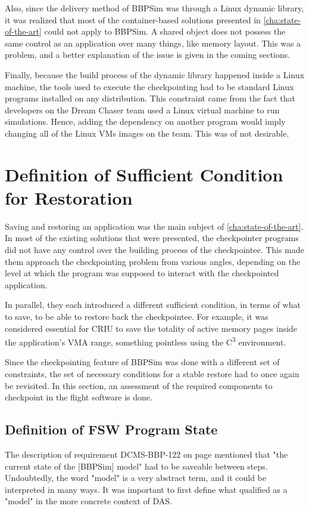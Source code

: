 {Also, since the delivery method of BBPSim was through a Linux dynamic library, it was realized that most of the container-based solutions presented in \autoref{cha:state-of-the-art} could not apply to BBPSim. A shared object does not possess the same control as an application over many things, like memory layout. This was a problem, and a better explanation of the issue is given in the coming sections.

Finally, because the build process of the dynamic library happened inside a Linux machine, the tools used to execute the checkpointing had to be standard Linux programs installed on any distribution. This constraint came from the fact that developers on the Dream Chaser team used a Linux virtual machine to run simulations. Hence, adding the dependency on another program would imply changing all of the Linux VMs images on the team. This was of not desirable.

\section{Definition of Sufficient Condition for Restoration}\label{sec:conditions}
Saving and restoring an application was the main subject of \autoref{cha:state-of-the-art}. In most of the existing solutions that were presented, the checkpointer programs did not have any control over the building process of the checkpointee. This made them approach the checkpointing problem from various angles, depending on the level at which the program was supposed to interact with the checkpointed application. 

In parallel, they each introduced a different sufficient condition, in terms of what to save, to be able to restore back the checkpointee. For example, it was considered essential for CRIU to save the totality of active memory pages inside the application's \gls{VMA} range, something pointless using the C\textsuperscript{3} environment.

Since the checkpointing feature of BBPSim was done with a different set of constraints, the set of necessary conditions for a stable restore had to once again be revisited. In this section, an assessment of the required components to checkpoint in the flight software is done. 

\subsection*{Definition of FSW Program State}
The description of requirement DCMS-BBP-122 on page \pageref{tab:customer-reqs} mentioned that "the current state of the [BBPSim] model" had to be saveable between steps. Undoubtedly, the word "model" is a very abstract term, and it could be interpreted in many ways. It was important to first define what qualified as a "model" in the more concrete context of DAS.

}
